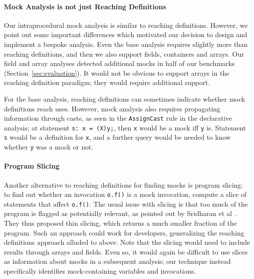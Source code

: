 
\paragraph{Mock Analysis is not just Reaching Definitions}
Our intraprocedural mock analysis is similar to reaching definitions. However, we point out some important differences which motivated our decision to design and implement a bespoke analysis. Even the base analysis requires slightly more than reaching definitions, and then we also support fields, containers and arrays. Our field and array analyses detected additional mocks in half of our benchmarks (Section~\ref{sec:evaluation}). It would not be obvious to support arrays in the reaching definition paradigm; they would require additional support.

For the base analysis, reaching definitions can sometimes indicate whether mock definitions reach uses. However, mock analysis also requires propagating information through casts, as seen in the \texttt{AssignCast} rule in the declarative analysis; at statement {\tt s: x = (X)y;}, then {\tt x} would be a mock iff {\tt y} is. Statement {\tt s} would be a definition for {\tt x}, and a further query would be needed to know whether {\tt y} was a mock or not.

\paragraph{Program Slicing}
Another alternative to reaching definitions for finding mocks is program slicing: to find out whether an invocation {\tt o.f()} is a mock invocation, compute a slice of statements that affect {\tt o.f()}. The usual issue with slicing is that too much of the program is flagged as potentially relevant, as pointed out by Sridharan et al~\cite{sridharan07:_thin_slicin}. They thus proposed thin slicing, which returns a much smaller fraction of the program. Such an approach could work for developers, generalizing the reaching definitions approach alluded to above. Note that the slicing would need to include results through arrays and fields. Even so, it would again be difficult to use slices as information about mocks in a subsequent analysis; our technique instead specifically identifies mock-containing variables and invocations.

